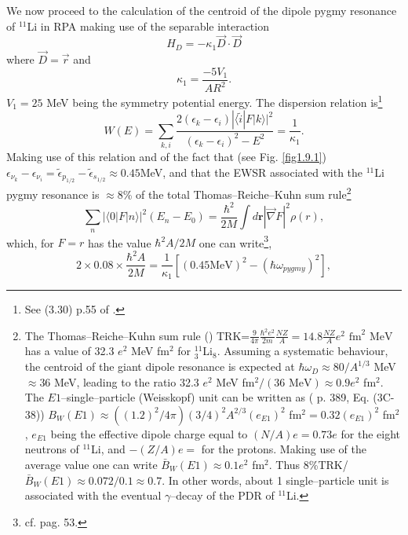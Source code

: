 We now proceed to the calculation of the centroid of the dipole pygmy resonance of $^{11}$Li in  RPA making use of the separable interaction
 \begin{equation}\label{eq2.F.6}
H_D=-\kappa_1\vec D\cdot\vec D
 \end{equation}
where $\vec D=\vec r$ and
 \begin{equation}
\kappa_1=\frac{-5V_1}{AR^2}.
 \end{equation}
  $V_1=25$ MeV being the symmetry potential energy.
The  dispersion relation is\footnote{See (3.30) p.55 of \cite{Bortignon:98}.}
\begin{equation}
W(E)=\sum_{k,i}\frac{2(\epsilon_k-\epsilon_i)|\langle \tilde i|F|k\rangle|^2}{(\epsilon_k-\epsilon_i)^2-E^2}=\frac{1}{\kappa_1}.
\end{equation}
 Making use of this relation and of the fact that (see Fig. \ref{fig1.9.1}) 
 $\epsilon_{\nu_k}-\epsilon_{\nu_i}=\tilde\epsilon_{p_{1/2}}-\tilde\epsilon_{s_{1/2}}\approx 0.45 $MeV, and that the EWSR associated with the $^{11}$Li pygmy resonance is $\approx 8$\% of the total Thomas--Reiche--Kuhn sum rule\footnote{The Thomas--Reiche--Kuhn sum rule (\cite{Bohr:75,Bortignon:98}) TRK=$\frac{9}{4\pi} \frac{\hbar^2e^2}{2m} \frac{NZ}{A}=14.8 \frac{NZ}{A} e^2\text{ fm}^2 \text{ MeV}$ has a value of 32.3 $e^2$ MeV fm$^2$ for $^{11}_3$Li$_8$. Assuming a systematic behaviour, the centroid of the giant dipole resonance is expected at $\hbar\omega_D\approx80/A^{1/3}$ MeV $\approx 36$ MeV, leading to the ratio 32.3 $e^2$ MeV fm$^2/(36\text{ MeV})\approx 0.9 e^2$ fm$^2$. The $E1$--single--particle (Weisskopf) unit can be written as (\cite{Bohr:69} p. 389, Eq. (3C-38)) $B_W(E1)\approx ((1.2)^2/4\pi) (3/4)^2 A^{2/3} (e_{E1})^2$ fm$^2=0.32 (e_{E1})^2$ fm$^2$, $e_{E1}$ being the effective dipole charge equal to $(N/A)e=0.73 e$ for the eight neutrons of $^{11}$Li, and $-(Z/A)e=$ for the protons. Making use of the average value one can write $\bar B_W(E1)\approx0.1 e^2$ fm$^2$. Thus 8\%TRK/$\bar B_W(E1)\approx 0.072/0.1\approx 0.7$. In other words, about 1 single--particle unit is associated with the eventual $\gamma$--decay of the PDR of $^{11}$Li.}
 \begin{equation}
\sum_n |\langle0|F|n\rangle|^2(E_n-E_0)=\frac{\hbar^2}{2M}\int d\mathbf r |\vec\nabla F|^2 \rho(r),
 \end{equation}
 which, for $F=r$ has the value $\hbar^2 A/2M$ one can write\footnote{cf. \cite{Bertsch:05} pag. 53.}, 
\begin{equation}
2\times 0.08\times \frac{\hbar^2A}{2M}=\frac{1}{\kappa_1}[(0.45\text{MeV})^2-(\hbar \omega_{pygmy})^2],
\end{equation}
